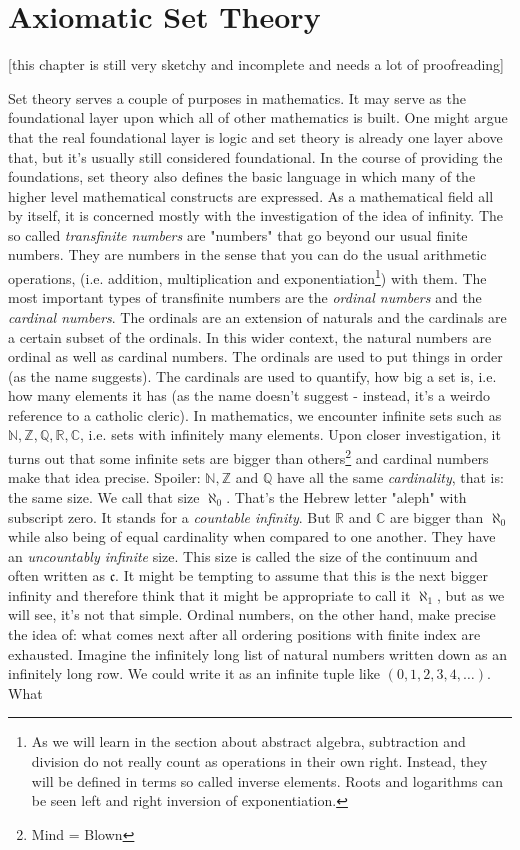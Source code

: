 \chapter{Axiomatic Set Theory}
[this chapter is still very sketchy and incomplete and needs a lot of proofreading]


Set theory serves a couple of purposes in mathematics. It may serve as the foundational layer upon which all of other mathematics is built. One might argue that the real foundational layer is logic and set theory is already one layer above that, but it's usually still considered foundational. In the course of providing the foundations, set theory also defines the basic language in which many of the higher level mathematical constructs are expressed. As a mathematical field all by itself, it is concerned mostly with the investigation of the idea of infinity. The so called \emph{transfinite numbers} are "numbers" that go beyond our usual finite numbers. They are numbers in the sense that you can do the usual arithmetic operations, (i.e. addition, multiplication and exponentiation\footnote{As we will learn in the section about abstract algebra, subtraction and division do not really count as operations in their own right. Instead, they will be defined in terms so called inverse elements. Roots and logarithms can be seen left and right inversion of exponentiation.}) with them. The most important types of transfinite numbers are the \emph{ordinal numbers} and the \emph{cardinal numbers}. The ordinals are an extension of naturals and the cardinals are a certain subset of the ordinals. In this wider context, the natural numbers are ordinal as well as cardinal numbers. The ordinals are used to put things in order (as the name suggests). The cardinals are used to quantify, how big a set is, i.e. how many elements it has (as the name doesn't suggest - instead, it's a weirdo reference to a catholic cleric). In mathematics, we encounter infinite sets such as $\mathbb{N}, \mathbb{Z}, \mathbb{Q}, \mathbb{R}, \mathbb{C}$, i.e. sets with infinitely many elements. Upon closer investigation, it turns out that some infinite sets are bigger than others\footnote{Mind = Blown} and cardinal numbers make that idea precise. Spoiler: $\mathbb{N}, \mathbb{Z}$ and $\mathbb{Q}$ have all the same \emph{cardinality}, that is: the same size. We call that size $\aleph_0$. That's the Hebrew letter "aleph" with subscript zero. It stands for a \emph{countable infinity}. But $\mathbb{R}$ and $\mathbb{C}$ are bigger than $\aleph_0$ while also being of equal cardinality when compared to one another. They have an \emph{uncountably infinite} size. This size is called the size of the continuum and often written as $\mathfrak{c}$. It might be tempting to assume that this is the next bigger infinity and therefore think that it might be appropriate to call it $\aleph_1$, but as we will see, it's not that simple. Ordinal numbers, on the other hand, make precise the idea of: what comes next after all ordering positions with finite index are exhausted. Imagine the infinitely long list of natural numbers written down as an infinitely long row. We could write it as an infinite tuple like $(0,1,2,3,4,\ldots)$. What 
